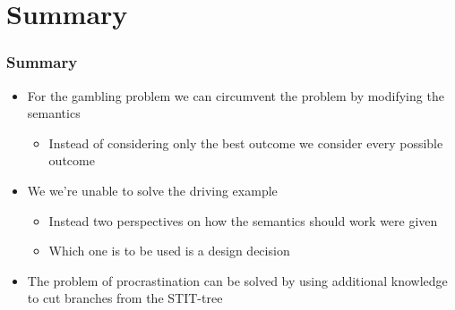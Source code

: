 \documentclass[usenames,dvipsnames]{beamer}
\begin{document}
    \section{Summary}
    \begin{frame}
        \frametitle{Summary}
    
        \begin{itemize}
            \item For the gambling problem we can circumvent the problem by modifying the semantics
            \begin{itemize}
                \item Instead of considering only the best outcome we consider every possible outcome
            \end{itemize}
            \item We we're unable to solve the driving example
            \begin{itemize}
                \item Instead two perspectives on how the semantics should work were given
                \item Which one is to be used is a design decision
            \end{itemize}
            \item The problem of procrastination can be solved by using additional knowledge to cut branches from the STIT-tree
        \end{itemize}
    
    \end{frame}
    
\end{document}
